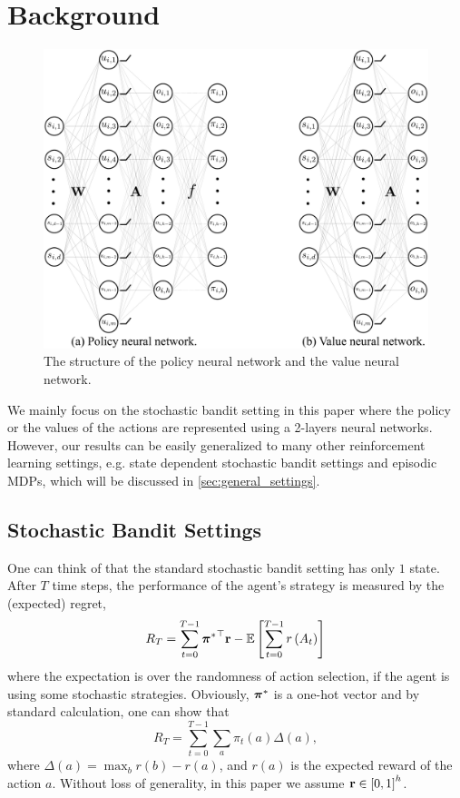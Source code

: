 \section{Background}
\label{sec:background}

\begin{figure}[t]
	\begin{center}
		\centerline{\includegraphics[width=0.55\columnwidth]{nn_policy_value_vertical.pdf}}
		\caption{The structure of the policy neural network and the value neural network.}
		\label{fig:nn_policy_value}
	\end{center}
	\vskip -0.2in
\end{figure}

We mainly focus on the stochastic bandit setting in this paper where the policy or the values of the actions are represented using a 2-layers neural networks.  
However, our results can be easily generalized to many other reinforcement learning settings, e.g. state dependent stochastic bandit settings and episodic MDPs, which will be discussed in \cref{sec:general_settings}.

\subsection{Stochastic Bandit Settings}
\label{subsec:settings}

One can think of that the standard stochastic bandit setting has only $1$ state.  
After $T$ time steps, the performance of the agent's strategy is measured by the (expected) regret,
\begin{equation}
\label{eq:expected_regret}
R_T = \sum\limits_{t=0}^{T-1}{{{\boldsymbol{\pi}}^*}^\top {\mathbf{r}}} - {\mathbb{E}} \left[ \sum\limits_{t=0}^{T-1}{  r\left(A_t\right)  } \right] 
\end{equation}
where the expectation is over the randomness of action selection, if the agent is using some stochastic strategies.
Obviously, ${\boldsymbol{\pi}}^*$ is a one-hot vector and by standard calculation, one can show that
\[
R_T = \sum_{t=0}^{T-1} \sum_a \pi_t(a) \Delta(a),
\]
where $\Delta(a) = \max_b r(b)- r(a)$, and  $r(a)$ is the expected reward of the action $a$.
Without loss of generality, in this paper we assume ${\mathbf{r}} \in \left[ 0, 1 \right]^h$.

